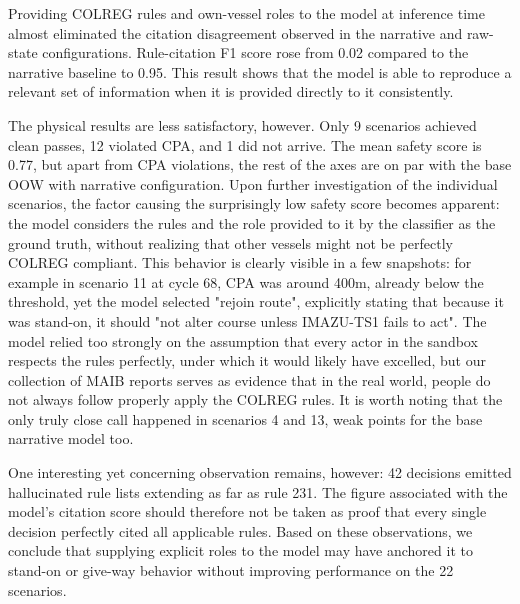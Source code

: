 \documentclass[10pt]{reportMaster}
\begin{document}
Providing COLREG rules and own-vessel roles to the model at inference time almost eliminated the citation disagreement observed in the narrative and raw-state configurations. Rule-citation F1 score rose from 0.02 compared to the narrative baseline to 0.95. This result shows that the model is able to reproduce a relevant set of information when it is provided directly to it consistently.

The physical results are less satisfactory, however. Only 9 scenarios achieved clean passes, 12 violated CPA, and 1 did not arrive. The mean safety score is 0.77, but apart from CPA violations, the rest of the axes are on par with the base OOW with narrative configuration. Upon further investigation of the individual scenarios, the factor causing the surprisingly low safety score becomes apparent: the model considers the rules and the role provided to it by the classifier as the ground truth, without realizing that other vessels might not be perfectly COLREG compliant. This behavior is clearly visible in a few snapshots: for example in scenario 11 at cycle 68, CPA was around 400m, already below the threshold, yet the model selected "rejoin route", explicitly stating that because it was stand-on, it should "not alter course unless IMAZU-TS1 fails to act". The model relied too strongly on the assumption that every actor in the sandbox respects the rules perfectly, under which it would likely have excelled, but our collection of MAIB reports serves as evidence that in the real world, people do not always follow properly apply the COLREG rules. It is worth noting that the only truly close call happened in scenarios 4 and 13, weak points for the base narrative model too. 

One interesting yet concerning observation remains, however: 42 decisions emitted hallucinated rule lists extending as far as rule 231. The figure associated with the model's citation score should therefore not be taken as proof that every single decision perfectly cited all applicable rules. Based on these observations, we conclude that supplying explicit roles to the model may have anchored it to stand-on or give-way behavior without improving performance on the 22 scenarios. 
\end{document}
